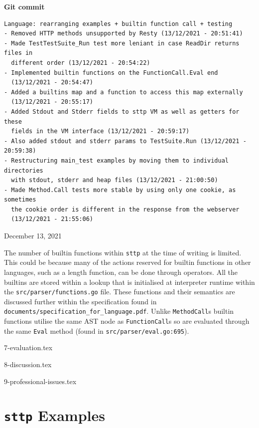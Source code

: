 \documentclass[]{full}
\theoremstyle{definition}
\begin{document}
\begin{center}
    \textbf{Git commit}
    \begin{verbatim}
Language: rearranging examples + builtin function call + testing
- Removed HTTP methods unsupported by Resty (13/12/2021 - 20:51:41)
- Made TestTestSuite_Run test more leniant in case ReadDir returns files in
  different order (13/12/2021 - 20:54:22)
- Implemented builtin functions on the FunctionCall.Eval end
  (13/12/2021 - 20:54:47)
- Added a builtins map and a function to access this map externally
  (13/12/2021 - 20:55:17)
- Added Stdout and Stderr fields to sttp VM as well as getters for these
  fields in the VM interface (13/12/2021 - 20:59:17)
- Also added stdout and stderr params to TestSuite.Run (13/12/2021 - 20:59:38)
- Restructuring main_test examples by moving them to individual directories
  with stdout, stderr and heap files (13/12/2021 - 21:00:50)
- Made Method.Call tests more stable by using only one cookie, as sometimes
  the cookie order is different in the response from the webserver
  (13/12/2021 - 21:55:06)
    \end{verbatim}
    \vspace{-1em}
    \tiny{December 13, 2021}
\end{center}

The number of builtin functions within \verb|sttp| at the time of writing is limited. This could be because many of the actions reserved for builtin functions in other languages, such as a length function, can be done through operators. All the builtins are stored within a lookup that is initialised at interpreter runtime within the \verb|src/parser/functions.go| file. These functions and their semantics are discussed further within the specification found in \verb|documents/specification_for_language.pdf|. Unlike \verb|MethodCall|s builtin functions utilise the same AST node as \verb|FunctionCall|s so are evaluated through the same \verb|Eval| method (found in \verb|src/parser/eval.go:695|).

{7-evaluation.tex}

{8-discussion.tex}

{9-professional-issues.tex}

\appendix

\cprotect\chapter{\verb|sttp| Examples}
\label{appendix:sttp-examples}
\end{document}
